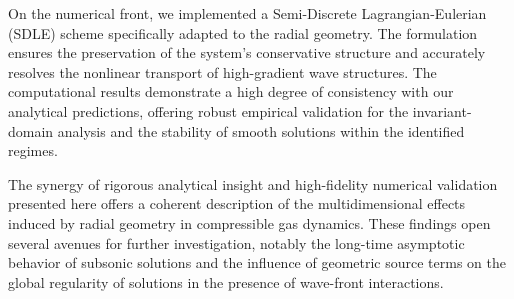 \documentclass[11pt]{article}
\begin{document}
On the numerical front, we implemented a Semi-Discrete Lagrangian-Eulerian (SDLE) scheme specifically adapted to the radial geometry. The formulation ensures the preservation of the system's conservative structure and accurately resolves the nonlinear transport of high-gradient wave structures. The computational results demonstrate a high degree of consistency with our analytical predictions, offering robust empirical validation for the invariant-domain analysis and the stability of smooth solutions within the identified regimes.

The synergy of rigorous analytical insight and high-fidelity numerical validation presented here offers a coherent description of the multidimensional effects induced by radial geometry in compressible gas dynamics. These findings open several avenues for further investigation, notably the long-time asymptotic behavior of subsonic solutions and the influence of geometric source terms on the global regularity of solutions in the presence of wave-front interactions.






\end{document}
